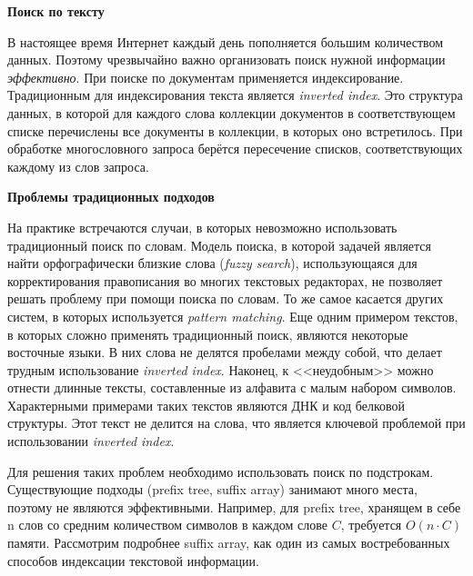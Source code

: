
\textbf{Поиск по тексту}

В настоящее время Интернет каждый день пополняется большим количеством данных.
Поэтому чрезвычайно важно организовать поиск нужной информации \emph{эффективно}.
При поиске по документам применяется индексирование.
Традиционным для индексирования текста является \emph{inverted index}.
Это структура данных, в которой для каждого слова коллекции документов в соответствующем списке
перечислены все документы в коллекции, в которых оно встретилось.
При обработке многословного запроса берётся пересечение списков, соответствующих каждому из слов запроса.

\textbf{Проблемы традиционных подходов}

На практике встречаются случаи, в которых невозможно использовать традиционный поиск по словам.
Модель поиска, в которой задачей является найти орфографически близкие слова (\emph{fuzzy search}),
использующаяся для корректирования правописания во многих текстовых редакторах,
не позволяет решать проблему при помощи поиска по словам.
То же самое касается других систем, в которых используется \emph{pattern matching}.
Еще одним примером текстов, в которых сложно применять традиционный поиск,
являются некоторые восточные языки.
В них слова не делятся пробелами между собой, что делает трудным использование \emph{inverted index}.
Наконец, к <<неудобным>> можно отнести длинные тексты, составленные из алфавита с малым набором символов.
Характерными примерами таких текстов являются ДНК и код белковой структуры.
Этот текст не делится на слова, что является ключевой проблемой при использовании \emph{inverted index}.

Для решения таких проблем необходимо использовать поиск по подстрокам.
Существующие подходы (prefix tree, suffix array) занимают много места, поэтому не являются эффективными.
Например, для prefix tree, хранящем в себе n слов со средним количеством символов в каждом слове $C$,
требуется $O(n \cdot C)$ памяти.
Рассмотрим подробнее suffix array, как один из самых востребованных способов индексации текстовой информации.

